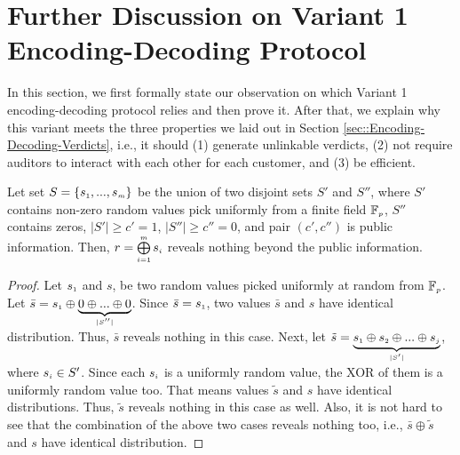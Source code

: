 

\vspace{-3mm}

\section{Further Discussion on Variant 1 Encoding-Decoding Protocol}\label{sec::Variant-1-Theorem-proof}
In this section, we first formally state our observation on which  Variant 1 encoding-decoding protocol relies and then prove it. After that, we explain why this variant meets the three properties we laid out in Section \ref{sec::Encoding-Decoding-Verdicts}, i.e., it should (1) generate unlinkable verdicts, (2) not require auditors to interact with each other for each customer, and (3) be efficient.



\begin{theorem}\label{set-xor}
Let set $S=\{s_{\scriptscriptstyle 1},..., s_{\scriptscriptstyle m}\}$ be the union of  two disjoint sets $S'$ and $S''$, where $S'$ contains non-zero random values pick uniformly  from a finite field $\mathbb{F}_{\scriptscriptstyle p}$, $S''$ contains zeros, $|S'|\geq c'=1$, $|S''|\geq c''=0$, and pair $(c',c'')$ is public information. Then, $r= \bigoplus\limits^{\scriptscriptstyle m}_{\scriptscriptstyle i=1} s_{\scriptscriptstyle i}$ reveals nothing beyond the public information.  
\end{theorem}

\begin{proof}
Let $s_{\scriptscriptstyle 1}$ and $s$, be two random values picked uniformly at random from $\mathbb{F}_{\scriptscriptstyle p}$. Let $\bar s=s_{\scriptscriptstyle 1}\oplus \underbrace{0\oplus... \oplus 0}_{\scriptscriptstyle |S''|}$. Since  $\bar s=s_{\scriptscriptstyle 1}$, two values $\bar s$ and $s$ have identical distribution. Thus, $\bar s$ reveals nothing in this case. Next, let $\tilde s=\underbrace{ s_{\scriptscriptstyle 1}\oplus s_{\scriptscriptstyle 2}\oplus... \oplus s_{\scriptscriptstyle j}}_{\scriptscriptstyle |S'|}$, where $s_{\scriptscriptstyle i}\in S'$. Since each $s_{\scriptscriptstyle i}$ is a uniformly random value,  the XOR of them is a uniformly random value too. That means values $\tilde s$ and $s$ have identical distributions. Thus, $\tilde s$ reveals nothing in this case as well. Also, it is not hard to see that the combination of the above two cases reveals nothing too, i.e., $\bar s\oplus \tilde s$ and $s$ have identical distribution. 
%
\end{proof}



